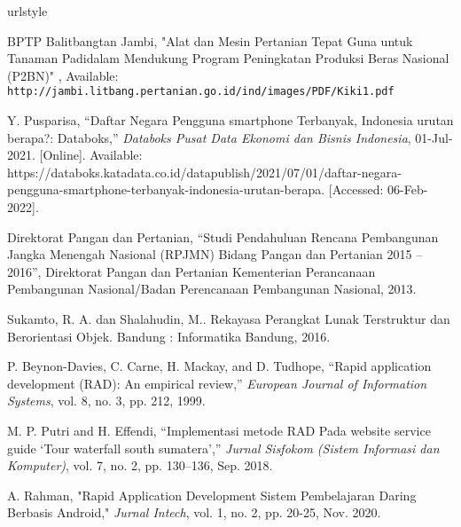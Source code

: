\begin{thebibliography}{7}
%
\providecommand{\natexlab}[1]{#1}
\providecommand{\url}[1]{\texttt{#1}}
\expandafter\ifx\csname urlstyle\endcsname\relax
  \providecommand{\doi}[1]{doi: #1}\else
  \providecommand{\doi}{doi: \begingroup \urlstyle{rm}\Url}\fi


BPTP Balitbangtan Jambi, "Alat dan Mesin Pertanian Tepat Guna untuk Tanaman Padidalam Mendukung Program Peningkatan Produksi Beras Nasional (P2BN)"
, Available: \url{http://jambi.litbang.pertanian.go.id/ind/images/PDF/Kiki1.pdf}

Y. Pusparisa, “Daftar Negara Pengguna smartphone Terbanyak, Indonesia urutan berapa?: Databoks,” \emph{Databoks Pusat Data Ekonomi dan Bisnis Indonesia}, 01-Jul-2021. [Online]. Available: https://databoks.katadata.co.id/datapublish/2021/07/01/daftar-negara-pengguna-smartphone-terbanyak-indonesia-urutan-berapa. [Accessed: 06-Feb-2022]. 

Direktorat Pangan dan Pertanian, “Studi Pendahuluan Rencana Pembangunan Jangka Menengah Nasional (RPJMN) Bidang Pangan dan Pertanian 2015 – 2016”, Direktorat Pangan dan Pertanian Kementerian Perancanaan Pembangunan Nasional/Badan Perencanaan Pembangunan Nasional, 2013.

Sukamto, R. A. dan Shalahudin, M.. Rekayasa Perangkat Lunak Terstruktur dan Berorientasi Objek. Bandung : Informatika Bandung, 2016.

P. Beynon-Davies, C. Carne, H. Mackay, and D. Tudhope, “Rapid application development (RAD): An empirical review,” \emph{European Journal of Information Systems}, vol. 8, no. 3, pp. 212, 1999. 

M. P. Putri and H. Effendi, “Implementasi metode RAD Pada website  service guide ‘Tour waterfall south sumatera’,” \emph{Jurnal Sisfokom (Sistem Informasi dan Komputer)}, vol. 7, no. 2, pp. 130–136, Sep. 2018. 

A. Rahman, "Rapid Application Development Sistem Pembelajaran Daring Berbasis Android," \emph{Jurnal Intech}, vol. 1, no. 2, pp. 20-25, Nov. 2020.


\end{thebibliography}
